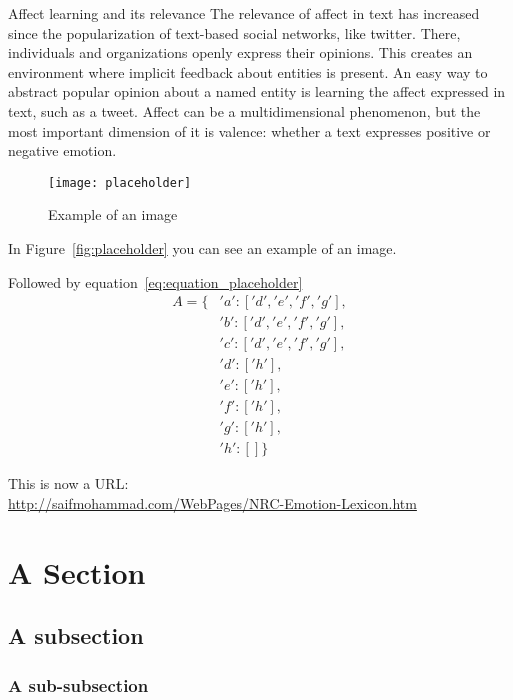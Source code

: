 Affect learning and its relevance
The relevance of affect in text has increased since the popularization of text-based social networks, like twitter. There, individuals and organizations openly express their opinions. This creates an environment where implicit feedback about entities is present. An easy way to abstract popular opinion about a named entity is learning the affect expressed in text, such as a tweet. Affect can be a multidimensional phenomenon, but the most important dimension of it is valence: whether a text expresses positive or negative emotion.


\begin{figure}[H]
  \texttt{[image: placeholder]}
  \centering
  \caption{Example of an image}
\end{figure}\label{fig:placeholder}


In Figure~\ref{fig:placeholder} you can see an example of an image.

Followed by equation~\ref{eq:equation_placeholder}
\begin{equation} \label{eq:equation_placeholder}
  \begin{split}
    A = \{&'a':['d','e','f','g'], \\
         &'b':['d','e','f','g'], \\
         &'c':['d','e','f','g'], \\
         &'d':['h'], \\
         &'e':['h'], \\
         &'f':['h'], \\
         &'g':['h'], \\
         &'h':[] \}
  \end{split}
\end{equation}

This is now a URL\@:\\
\url{http://saifmohammad.com/WebPages/NRC-Emotion-Lexicon.htm}


\section{A Section}\label{sec:A Section}


\subsection{A subsection}\label{sub:A subsection}


\subsubsection{A sub-subsection}\label{subs:A sub-subsection}



